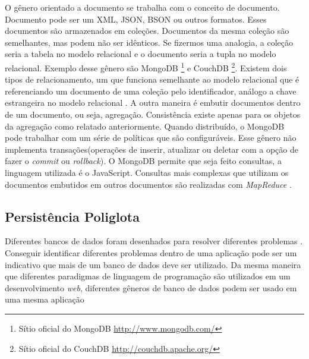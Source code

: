 O gênero orientado a documento se trabalha com o conceito de documento. Documento pode ser um \ac{XML}, JSON, BSON ou outros formatos. Esses documentos são armazenados em coleções. Documentos da mesma coleção são semelhantes, mas podem não ser idênticos. Se fizermos uma analogia, a coleção seria a tabela no modelo relacional e o documento seria a tupla no modelo relacional. Exemplo desse gênero são MongoDB \footnote{Sítio oficial do MongoDB \url{http://www.mongodb.com/}} e CouchDB \footnote{Sítio oficial do CouchDB \url{http://couchdb.apache.org/}}\cite{NoSQL}.
Existem dois tipos de relacionamento, um que funciona semelhante ao modelo relacional que é referenciando um documento de uma coleção pelo identificador, análogo a chave estrangeira no modelo relacional . A outra maneira é embutir documentos dentro de um documento, ou seja, agregação. Consistência existe apenas para os objetos da agregação como relatado anteriormente. Quando distribuído, o MongoDB pode trabalhar com um série de políticas que são configuráveis. Esse gênero não implementa transações(operações de inserir, atualizar ou deletar com a opção de fazer o \textit{commit} ou \textit{rollback}). O MongoDB permite que seja feito consultas, a linguagem utilizada é o JavaScript. Consultas mais complexas que utilizam os documentos embutidos em outros documentos são realizadas com \textit{MapReduce} \cite{NoSQL}.

\subsection{Persistência Poliglota}
\label{subsec:polyglotpersitence}
Diferentes bancos de dados foram desenhados para resolver diferentes problemas \cite{NoSQL}. Conseguir identificar diferentes problemas dentro de uma aplicação pode ser um indicativo que mais de um banco de dados deve ser utilizado. Da mesma maneira que diferentes paradigmas de linguagem de programação são utilizados em um desenvolvimento \textit{web}, diferentes gêneros de banco de dados podem ser usado em uma mesma aplicação \cite{multiparadigma}


